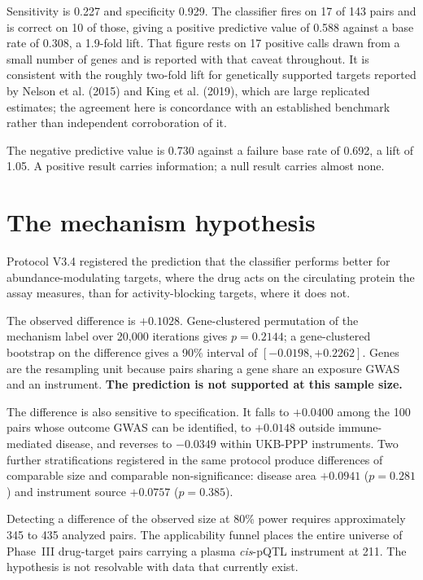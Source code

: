 \documentclass[11pt,a4paper]{article}
\begin{document}
\vspace{-0.5em}
Sensitivity is 0.227 and specificity 0.929. The classifier fires on 17 of 143 pairs and is
correct on 10 of those, giving a positive predictive value of 0.588 against a base rate of
0.308, a 1.9-fold lift. That figure rests on 17 positive calls drawn from a small number of
genes and is reported with that caveat throughout. It is consistent with the roughly
two-fold lift for genetically supported targets reported by Nelson et al. (2015) and King
et al. (2019), which are large replicated estimates; the agreement here is concordance with
an established benchmark rather than independent corroboration of it.

The negative predictive value is 0.730 against a failure base rate of 0.692, a lift of
1.05. A positive result carries information; a null result carries almost none.

\section{The mechanism hypothesis}

Protocol V3.4 registered the prediction that the classifier performs better for
abundance-modulating targets, where the drug acts on the circulating protein the assay
measures, than for activity-blocking targets, where it does not.

The observed difference is $+0.1028$. Gene-clustered permutation of the mechanism label
over 20{,}000 iterations gives $p = 0.2144$; a gene-clustered bootstrap on the difference
gives a 90\% interval of $[-0.0198, +0.2262]$. Genes are the resampling unit because pairs
sharing a gene share an exposure GWAS and an instrument. \textbf{The prediction is not
supported at this sample size.}

The difference is also sensitive to specification. It falls to $+0.0400$ among the 100
pairs whose outcome GWAS can be identified, to $+0.0148$ outside immune-mediated disease,
and reverses to $-0.0349$ within UKB-PPP instruments. Two further stratifications registered
in the same protocol produce differences of comparable size and comparable
non-significance: disease area $+0.0941$ ($p = 0.281$) and instrument source $+0.0757$
($p = 0.385$).

Detecting a difference of the observed size at 80\% power requires approximately 345 to 435
analyzed pairs. The applicability funnel places the entire universe of Phase~III
drug-target pairs carrying a plasma \emph{cis}-pQTL instrument at 211. The hypothesis is
not resolvable with data that currently exist.
\end{document}
